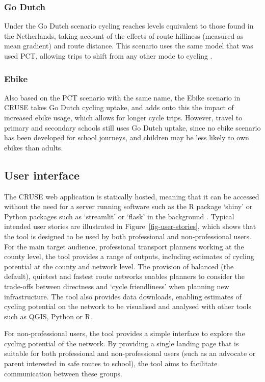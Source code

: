 \documentclass[
  super,
  preprint,
  3p]{elsarticle}
\begin{document}
\subsubsection{Go Dutch}\label{go-dutch}

Under the Go Dutch scenario cycling reaches levels equivalent to those
found in the Netherlands, taking account of the effects of route
hilliness (measured as mean gradient) and route distance. This scenario
uses the same model that was used PCT, allowing trips to shift from any
other mode to cycling \citep{lovelace2017}.

\subsubsection{Ebike}\label{ebike}

Also based on the PCT scenario with the same name, the Ebike scenario in
CRUSE takes Go Dutch cycling uptake, and adds onto this the impact of
increased ebike usage, which allows for longer cycle trips. However,
travel to primary and secondary schools still uses Go Dutch uptake,
since no ebike scenario has been developed for school journeys, and
children may be less likely to own ebikes than adults.

\subsection{User interface}\label{sec-ui}

The CRUSE web application is statically hosted, meaning that it can be
accessed without the need for a server running software such as the R
package `shiny' or Python packages such as `streamlit' or `flask' in the
background \citep{wickham2021}. Typical intended user stories are
illustrated in Figure~\ref{fig-user-stories}, which shows that the tool
is designed to be used by both professional and non-professional users.
For the main target audience, professional transport planners working at
the county level, the tool provides a range of outputs, including
estimates of cycling potential at the county and network level. The
provision of balanced (the default), quietest and fastest route networks
enables planners to consider the trade-offs between directness and
`cycle friendliness' when planning new infrastructure. The tool also
provides data downloads, enabling estimates of cycling potential on the
network to be visualised and analysed with other tools such as QGIS,
Python or R.

For non-professional users, the tool provides a simple interface to
explore the cycling potential of the network. By providing a single
landing page that is suitable for both professional and non-professional
users (such as an advocate or parent interested in safe routes to
school), the tool aims to facilitate communication between these groups.
\end{document}
